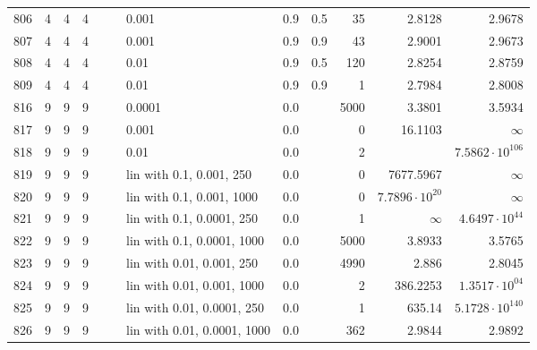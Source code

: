 \begin{longtable}{lrrrrrlrrrrr}
  806 &       4 & 4 & 4 &   &   &                       0.001 &      0.9 &    0.5 &      35 &                 2.8128 &                 2.9678 \\
  807 &       4 & 4 & 4 &   &   &                       0.001 &      0.9 &    0.9 &      43 &                 2.9001 &                 2.9673 \\
  808 &       4 & 4 & 4 &   &   &                        0.01 &      0.9 &    0.5 &     120 &                 2.8254 &                 2.8759 \\
  809 &       4 & 4 & 4 &   &   &                        0.01 &      0.9 &    0.9 &       1 &                 2.7984 &                 2.8008 \\
  816 &       9 & 9 & 9 &   &   &                      0.0001 &      0.0 &        &    5000 &                 3.3801 &                 3.5934 \\
  817 &       9 & 9 & 9 &   &   &                       0.001 &      0.0 &        &       0 &                16.1103 &               $\infty$ \\
  818 &       9 & 9 & 9 &   &   &                        0.01 &      0.0 &        &       2 &                        & $7.5862\cdot 10^{106}$ \\
  819 &       9 & 9 & 9 &   &   &    lin with 0.1, 0.001, 250 &      0.0 &        &       0 &              7677.5967 &               $\infty$ \\
  820 &       9 & 9 & 9 &   &   &   lin with 0.1, 0.001, 1000 &      0.0 &        &       0 &  $7.7896\cdot 10^{20}$ &               $\infty$ \\
  821 &       9 & 9 & 9 &   &   &   lin with 0.1, 0.0001, 250 &      0.0 &        &       1 &               $\infty$ &  $4.6497\cdot 10^{44}$ \\
  822 &       9 & 9 & 9 &   &   &  lin with 0.1, 0.0001, 1000 &      0.0 &        &    5000 &                 3.8933 &                 3.5765 \\
  823 &       9 & 9 & 9 &   &   &   lin with 0.01, 0.001, 250 &      0.0 &        &    4990 &                  2.886 &                 2.8045 \\
  824 &       9 & 9 & 9 &   &   &  lin with 0.01, 0.001, 1000 &      0.0 &        &       2 &               386.2253 &  $1.3517\cdot 10^{04}$ \\
  825 &       9 & 9 & 9 &   &   &  lin with 0.01, 0.0001, 250 &      0.0 &        &       1 &                 635.14 & $5.1728\cdot 10^{140}$ \\
  826 &       9 & 9 & 9 &   &   & lin with 0.01, 0.0001, 1000 &      0.0 &        &     362 &                 2.9844 &                 2.9892 \\

\end{longtable}
